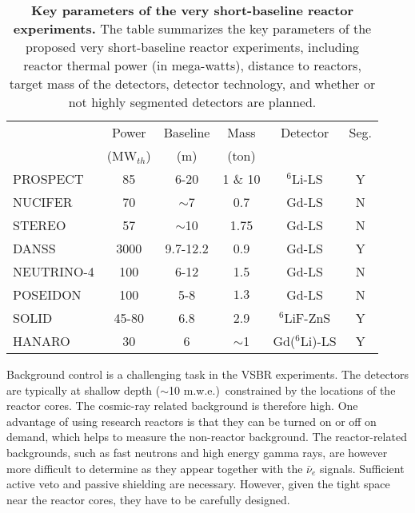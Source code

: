 \documentclass[aps,twocolumn,preprintnumbers,amsmath,superscriptaddress,amssymb,floats,nofootinbib]{revtex4-1}
\begin{document}
\begin{table}[tb]
  \begin{tabular}{lccccc}
  \hline
  & Power & Baseline & Mass & Detector & Seg. \\
  & (MW$_{th}$) & (m) & (ton) &    & \\
  \hline
  PROSPECT  & 85  & 6-20 & 1 \& 10  & $^6$Li-LS & Y \\
  NUCIFER   & 70 & $\sim$7  & 0.7 & Gd-LS & N \\
  STEREO & 57  & $\sim$10 & 1.75  & Gd-LS & N \\
  DANSS & 3000  & 9.7-12.2  & 0.9  & Gd-LS & Y \\
  NEUTRINO-4 & 100  & 6-12  & 1.5  & Gd-LS & N \\
  POSEIDON & 100  & 5-8  & $1.3$ & Gd-LS & N \\
  SOLID & 45-80 & 6.8  & 2.9  & $^6$LiF-ZnS & Y \\
  HANARO & 30  & 6  & $\sim$1  & Gd($^6$Li)-LS & Y \\
  \hline
  \end{tabular}
  \caption{{\bf Key parameters of the very short-baseline reactor experiments.} The table summarizes the key parameters of the proposed very short-baseline reactor experiments, including reactor thermal power (in mega-watts), distance to reactors, target mass of the detectors, detector technology, and whether or not highly segmented detectors are planned.}
\label{tab:sterile}
\end{table}

Background control is a challenging task in the VSBR experiments. 
The detectors are typically at shallow depth ($\sim$10 m.w.e.)\ constrained by the locations of the reactor cores. 
The cosmic-ray related background is therefore high. 
One advantage of using research reactors is that they can be turned on or off on demand, which helps to measure the non-reactor background. 
The reactor-related backgrounds, such as fast neutrons and high energy gamma rays, are however more difficult to determine
as they appear together with the $\bar\nu_e$ signals. 
Sufficient active veto and passive shielding are necessary. However, given the tight space near the reactor cores,  they have to be carefully designed.
\end{document}
